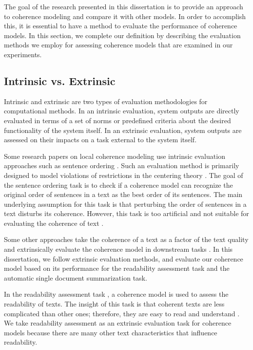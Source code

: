 The goal of the research presented in this dissertation is to provide an approach to coherence modeling and compare it with other models. 
In order to accomplish this, it is essential to have a method to evaluate the performance of coherence models. 
In this section, we complete our definition by describing the evaluation methods we employ for assessing coherence models that are examined in our experiments. 

\subsection{Intrinsic vs. Extrinsic}

Intrinsic and extrinsic are two types of evaluation methodologies for computational methods.  
In an intrinsic evaluation, system outputs are directly evaluated in terms of a set of norms or predefined criteria about the desired functionality of the system itself. 
In an extrinsic evaluation, system outputs are assessed on their impacts on a task external to the system itself. 

Some research papers on local coherence modeling use intrinsic evaluation approaches such as sentence ordering \cite{lapata03, mihalcea04b, karamanis04a, barzilay04, barzilay08}. 
Such an evaluation method is primarily designed to model violations of restrictions in the centering theory \cite{karamanis04a}. 
The goal of the sentence ordering task is to check if a coherence model can recognize the original order of sentences in a text as the best order of its sentences. 
The main underlying assumption for this task is that perturbing the order of sentences in a text disturbs its coherence.  
However, this task is too artificial and not suitable for evaluating the coherence of text \cite{lai18}.  

Some other approaches take the coherence of a text as a factor of the text quality and extrinsically evaluate the coherence model in downstream tasks \cite{miltsakaki04a,yannakoudakis12}. 
In this dissertation, we follow extrinsic evaluation methods, and evaluate our coherence model based on its performance for the readability assessment task and the automatic single document summarization task.  

In the readability assessment task  \cite{miltsakaki00,pitler08,petersen09,flor13}, a coherence model is used to assess the readability of texts. 
The insight of this task is that coherent texts are less complicated than other ones; therefore, they are easy to read and understand \cite{pitler08}. 
We take readability assessment as an extrinsic evaluation task for coherence models because there are many other text characteristics that influence readability.  


